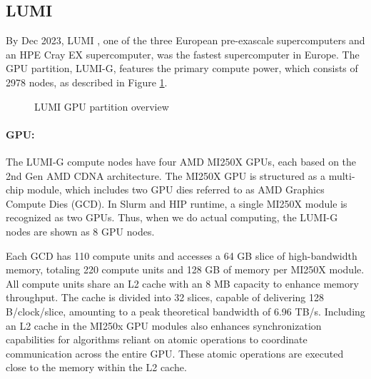 \subsection{LUMI}
By Dec 2023, LUMI \cite{lumi}, one of the three European pre-exascale supercomputers and an HPE Cray EX supercomputer, was the fastest supercomputer in Europe. The GPU partition, LUMI-G, features the primary compute power, which consists of 2978 nodes, as described in Figure \ref{fig_lumig_overview}.

\begin{figure}[H]
    \centering
    \caption{LUMI GPU partition overview \cite{lumi}}
    \label{fig_lumig_overview}
\end{figure}

\paragraph{GPU:}\mbox{}

The LUMI-G compute nodes have four AMD MI250X GPUs, each based on the 2nd Gen AMD CDNA architecture. The MI250X GPU is structured as a multi-chip module, which includes two GPU dies referred to as AMD Graphics Compute Dies (GCD). In Slurm and HIP runtime, a single MI250X module is recognized as two GPUs. Thus, when we do actual computing, the LUMI-G nodes are shown as 8 GPU nodes.

Each GCD has 110 compute units and accesses a 64 GB slice of high-bandwidth memory, totaling 220 compute units and 128 GB of memory per MI250X module. All compute units share an L2 cache with an 8 MB capacity to enhance memory throughput. The cache is divided into 32 slices, capable of delivering 128 B/clock/slice, amounting to a peak theoretical bandwidth of 6.96 TB/s. Including an L2 cache in the MI250x GPU modules also enhances synchronization capabilities for algorithms reliant on atomic operations to coordinate communication across the entire GPU. These atomic operations are executed close to the memory within the L2 cache.



